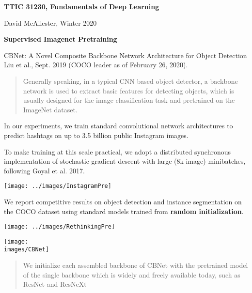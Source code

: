 





{\Huge
  \centerline{\bf TTIC 31230,  Fundamentals of Deep Learning}
  \vfill
  \centerline{David McAllester, Winter 2020}
  \vfill
  \centerline{\bf Supervised Imagenet Pretraining}
  \vfill
  \vfill
  

CBNet: A Novel Composite Backbone Network Architecture for Object Detection
Liu et al., Sept. 2019 (COCO leader as of February 26, 2020).

\vfill
\begin{quotation}
Generally speaking, in a typical CNN based object detector, a backbone network is used to extract basic features for detecting objects, which is usually designed for
the image classification task and pretrained on the ImageNet
dataset.
\end{quotation}


In our experiments, we train standard convolutional network architectures to
predict hashtags on up to 3.5 billion public Instagram images.

\vfill
To make training at this scale practical, we adopt a distributed synchronous implementation of
stochastic gradient descent with large (8k image) minibatches, following Goyal et al. 2017.


\centerline{\texttt{[image: ../images/InstagramPre]}}


We report competitive results on object detection and instance segmentation on the COCO dataset using standard
models trained from {\bf random initialization}.



\centerline{\texttt{[image: ../images/RethinkingPre]}}


\centerline{\texttt{[image: \\images/CBNet]}}



\begin{quotation}
We initialize each assembled backbone of CBNet with the pretrained model of the single backbone which is widely and
freely available today, such as ResNet and ResNeXt
\end{quotation}


}

